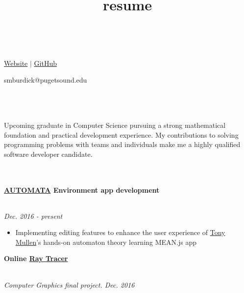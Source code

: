 \documentclass[11pt]{article}
\title{resume}
\newcommand\phv{\fontfamily{phv}\selectfont}
\begin{document}
\centerline{{\Huge \bf \phv{Sam Burdick}}}    %
\noindent\\
\centerline{
{\textcolor{blue}{\href{https://smburdick.github.io/}{Website}} \hspace{1.5pt} $|$ \hspace{1.5pt}
\textcolor{blue}{\href{https://github.com/smburdick}{GitHub}}
}}
\centerline{{smburdick@pugetsound.edu}}
\\\\
\noindent {\LARGE \bf \phv{Summary}}   %
\medskip\\
\noindent
Upcoming graduate in Computer Science pursuing a strong mathematical foundation and practical development experience. My contributions to solving programming problems with teams and individuals make me a highly qualified software developer candidate. \\\\
\smallskip
\noindent{\LARGE \bf \phv{Work Experience} }  \medskip\\
\noindent \centerline{\large \bf {\textcolor{blue}{\href{https://tmfsa.herokuapp.com/}{AUTOMATA}} Environment app development \hfill  }}
\\\emph{Dec. 2016 - present}
\begin{itemize}
\item Implementing editing features to enhance the user experience of \textcolor{blue}{\href{http://mathcs.pugetsound.edu/~tmullen/}{Tony Mullen}}'s hands-on automaton theory learning MEAN.js app
\end{itemize}
\noindent \centerline{\large \bf Online {\textcolor{blue}{\href{https://smburdick.github.io/threejs-raytracer}{Ray Tracer}} \hfill }}
\\\emph{Computer Graphics final project. Dec. 2016}
\end{document}
